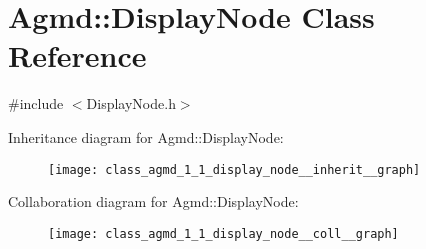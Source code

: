 \hypertarget{class_agmd_1_1_display_node}{\section{Agmd\+:\+:Display\+Node Class Reference}
\label{class_agmd_1_1_display_node}
}


{\ttfamily \#include $<$Display\+Node.\+h$>$}



Inheritance diagram for Agmd\+:\+:Display\+Node\+:\nopagebreak
\begin{figure}[H]
\begin{center}
\leavevmode
\texttt{[image: class\_agmd\_1\_1\_display\_node\_\_inherit\_\_graph]}
\end{center}
\end{figure}


Collaboration diagram for Agmd\+:\+:Display\+Node\+:\nopagebreak
\begin{figure}[H]
\begin{center}
\leavevmode
\texttt{[image: class\_agmd\_1\_1\_display\_node\_\_coll\_\_graph]}
\end{center}
\end{figure}
